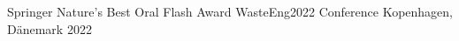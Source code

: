 

\begin{cvhonors}

\cvhonor
{Springer Nature’s Best Oral Flash Award}
{WasteEng2022 Conference}
{Kopenhagen, Dänemark}
{2022}
\end{cvhonors}